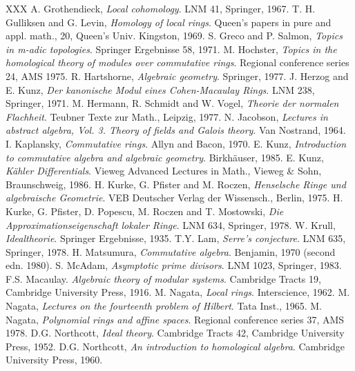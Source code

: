 \begin{thebibliography}{XXX}
 A. Grothendieck, \textit{Local cohomology}. LNM 41, Springer, 1967.
 T. H. Gulliksen and G. Levin, \textit{Homology of local rings}. Queen's papers in pure and appl. math., 20, Queen's Univ. Kingston, 1969.
 S. Greco and P. Salmon, \textit{Topics in m-adic topologies}. Springer Ergebnisse 58, 1971.
 M. Hochster, \textit{Topics in the homological theory of modules over commutative rings}. Regional conference series 24, AMS 1975.
 R. Hartshorne, \textit{Algebraic geometry}. Springer, 1977.
 J. Herzog and E. Kunz, \textit{Der kanonische Modul eines Cohen-Macaulay Rings}. LNM 238, Springer, 1971.
 M. Hermann, R. Schmidt and W. Vogel, \textit{Theorie der normalen Flachheit}. Teubner Texte zur Math., Leipzig, 1977.
 N. Jacobson, \textit{Lectures in abstract algebra, Vol. 3. Theory of fields and Galois theory}. Van Nostrand, 1964.
 I. Kaplansky, \textit{Commutative rings}. Allyn and Bacon, 1970.
 E. Kunz, \textit{Introduction to commutative algebra and algebraic geometry}. Birkh\"auser, 1985.
 E. Kunz, \textit{K\"ahler Differentials}. Vieweg Advanced Lectures in Math., Vieweg \& Sohn, Braunschweig, 1986.
 H. Kurke, G. Pfister and M. Roczen, \textit{Henselsche Ringe und algebraische Geometrie}. VEB Deutscher Verlag der Wissensch., Berlin, 1975.
 H. Kurke, G. Pfister, D. Popescu, M. Roczen and T. Mostowski, \textit{Die Approximationseigenschaft lokaler Ringe}. LNM 634, Springer, 1978.
 W. Krull, \textit{Idealtheorie}. Springer Ergebnisse, 1935.
 T.Y. Lam, \textit{Serre's conjecture}. LNM 635, Springer, 1978.
 H. Matsumura, \textit{Commutative algebra}. Benjamin, 1970 (second edn. 1980).
 S. McAdam, \textit{Asymptotic prime divisors}. LNM 1023, Springer, 1983.
 F.S. Macaulay. \textit{Algebraic theory of modular systems}. Cambridge Tracts 19, Cambridge University Press, 1916.
 M. Nagata, \textit{Local rings}. Interscience, 1962.
 M. Nagata, \textit{Lectures on the fourteenth problem of Hilbert}. Tata Inst., 1965.
 M. Nagata, \textit{Polynomial rings and affine spaces}. Regional conference series 37, AMS 1978.
 D.G. Northcott, \textit{Ideal theory}. Cambridge Tracts 42, Cambridge University Press, 1952.
 D.G. Northcott, \textit{An introduction to homological algebra}. Cambridge University Press, 1960.

\end{thebibliography}
